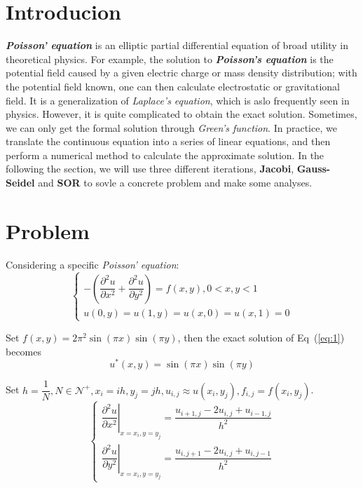 \documentclass[a4paper,11pt]{article}
\begin{document}
\section{Introducion}
\textit{\textbf{Poisson' equation}} is an elliptic partial differential equation of broad utility in theoretical physics. For example, the solution to \textit{\textbf{Poisson's equation}} is the potential field caused by a given electric charge or mass density distribution; with the potential field known, one can then calculate electrostatic or gravitational field. It is a generalization of \textit{Laplace's equation}, which is aslo frequently seen in physics. However, it is quite complicated to obtain the exact solution. Sometimes, we can only get the formal solution through \textit{Green's function}. In practice, we translate the continuous equation into a series of linear equations, and then perform a numerical method to calculate the approximate solution. In the following the section, we will use three different iterations, \textbf{Jacobi}, \textbf{Gauss-Seidel} and \textbf{SOR} to sovle a concrete problem and make some analyses. 

\section{Problem}
Considering a specific \textit{Poisson' equation}:
\begin{equation}\label{eq:1}
    \begin{cases}
        -\left(\dfrac{\partial^{2}u}{\partial x^2}+\dfrac{\partial^{2}u}{\partial y^2}\right)=f(x,y), 0<x,y<1 \\
        u(0,y)=u(1,y)=u(x,0)=u(x,1)=0
    \end{cases}
\end{equation}

Set $f(x,y)=2\pi^2 \sin(\pi x)\sin(\pi y)$, then the exact solution of Eq~(\ref{eq:1}) becomes
\begin{equation}\label{eq:2}
    u^{*}(x,y)=\sin(\pi x)\sin(\pi y)
\end{equation}

Set $h=\dfrac{1}{N}, N\in \mathcal{N}^{+}, x_{i}=ih, y_{j}=jh, u_{i,j}\approx u(x_{i},y_{j}), f_{i,j}=f(x_{i},y_{j})$.
\begin{equation}
    \begin{cases}
        \left.\dfrac{\partial^{2}u}{\partial x^2}\right|_{x=x_{i},y=y_{j}}=\dfrac{u_{i+1,j}-2u_{i,j}+u_{i-1,j}}{h^2}\\
        \left.\dfrac{\partial^{2}u}{\partial y^2}\right|_{x=x_{i},y=y_{j}}=\dfrac{u_{i,j+1}-2u_{i,j}+u_{i,j-1}}{h^2}
    \end{cases}
\end{equation}
\end{document}
